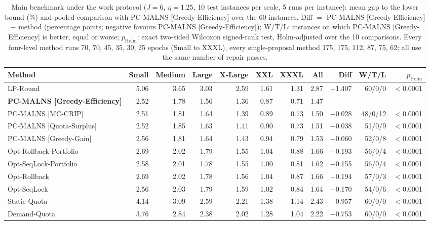 \begin{table}[pos=!htb]
\centering
\caption{Main benchmark under the work protocol ($J = 6$, $\eta = 1.25$, 10 test instances per scale, 5 runs per instance): mean gap to the lower bound (\%) and pooled comparison with PC-MALNS [Greedy-Efficiency] over the 60 instances. Diff $=$ PC-MALNS [Greedy-Efficiency] $-$ method (percentage points; negative favours PC-MALNS [Greedy-Efficiency]); W/T/L: instances on which PC-MALNS [Greedy-Efficiency] is better, equal or worse; $p_{\text{Holm}}$: exact two-sided Wilcoxon signed-rank test, Holm-adjusted over the 10 comparisons. Every four-level method runs 70, 70, 45, 35, 30, 25 epochs (Small to XXXL), every single-proposal method 175, 175, 112, 87, 75, 62; all use the same number of repair passes.}
\label{tab:main}
\scriptsize
\begin{tabular}{@{}lrrrrrrrrrr@{}}
\toprule
Method & Small & Medium & Large & X-Large & XXL & XXXL & All & Diff & W/T/L & $p_{\text{Holm}}$ \\
\midrule
LP-Round & 5.06 & 3.65 & 3.03 & 2.59 & 1.61 & 1.31 & 2.87 & $-$1.407 & 60/0/0 & $<$0.0001 \\
\textbf{PC-MALNS [Greedy-Efficiency]} & 2.52 & 1.78 & 1.56 & 1.36 & 0.87 & 0.71 & 1.47 &  &  &  \\
\addlinespace
PC-MALNS [MC-CRIP] & 2.51 & 1.81 & 1.64 & 1.39 & 0.89 & 0.73 & 1.50 & $-$0.028 & 48/0/12 & $<$0.0001 \\
PC-MALNS [Quota-Surplus] & 2.52 & 1.85 & 1.63 & 1.41 & 0.90 & 0.73 & 1.51 & $-$0.038 & 51/0/9 & $<$0.0001 \\
PC-MALNS [Greedy-Gain] & 2.56 & 1.81 & 1.64 & 1.43 & 0.94 & 0.79 & 1.53 & $-$0.060 & 52/0/8 & $<$0.0001 \\
\addlinespace
Opt-Rollback-Portfolio & 2.69 & 2.02 & 1.79 & 1.55 & 1.04 & 0.88 & 1.66 & $-$0.193 & 56/0/4 & $<$0.0001 \\
Opt-SeqLock-Portfolio & 2.58 & 2.01 & 1.78 & 1.55 & 1.00 & 0.81 & 1.62 & $-$0.155 & 56/0/4 & $<$0.0001 \\
Opt-Rollback & 2.69 & 2.02 & 1.78 & 1.56 & 1.04 & 0.87 & 1.66 & $-$0.194 & 57/0/3 & $<$0.0001 \\
Opt-SeqLock & 2.56 & 2.03 & 1.79 & 1.59 & 1.02 & 0.84 & 1.64 & $-$0.170 & 54/0/6 & $<$0.0001 \\
\addlinespace
Static-Quota & 4.14 & 3.09 & 2.59 & 2.21 & 1.38 & 1.14 & 2.43 & $-$0.957 & 60/0/0 & $<$0.0001 \\
Demand-Quota & 3.76 & 2.84 & 2.38 & 2.02 & 1.28 & 1.04 & 2.22 & $-$0.753 & 60/0/0 & $<$0.0001 \\
\bottomrule
\end{tabular}
\end{table}
